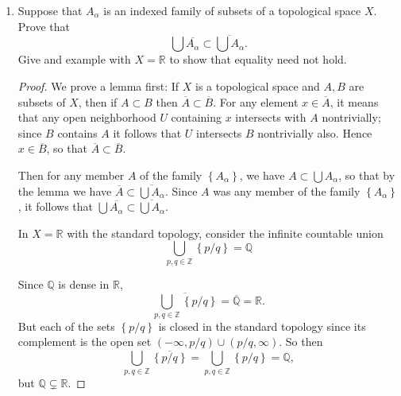 \documentclass[11pt]{article}
\newcommand{\cbr}[1]{\left\{#1\right\}}
\begin{document}
\begin{enumerate}
\begin{proof}
      If there exist $y_1,y_2,x_3\in X$ with $y_1 < x_1 <x_3 < x_2 < y_2$, then we can choose disjoint neighborhoods $(y_1, x_3)$ and $(x_3, y_2)$ containing $x_1$ and $x_2$ respectively. In this case if $x_2$ is maximal in $X$ then take the neighborhood containing $x_2$ to be $(x_3, x_2]$; similarly if $x_1$ is minimal in $X$ then take the neighborhood containing $x_1$ to be $[x_1,x_3)$.
      
      If such an $x_3$ does not exist (that is, $x_1$ immediately precedes $x_2$) then choose the disjoint neighborhoods containing $x_1$ and $x_2$ respectively to be $(y_1, x_2)$ and $(x_1,y_2)$. In this case if $x_2$ is maximal in $X$ then take the neighborhood containing $x_2$ to be $(x_1, x_2]$; similarly if $x_1$ is minimal in $X$ then take the neighborhood containing $x_1$ to be $[x_1,x_2)$.

      Thus we can form disjoint neighborhoods around any $x_1$ and $x_2$ in $X$, so $X$ is Hausdorff.
    \end{proof}
    \item Suppose that $A_\alpha$ is an indexed family of subsets of a topological space $X$. Prove that \[\bigcup \overline{A_\alpha}\subset \overline{\bigcup A_\alpha}.\] Give and example with $X = \mathbb{R}$ to show that equality need not hold.
    \begin{proof}
      We prove a lemma first: If $X$ is a topological space and $A,B$ are subsets of $X$, then if $A\subset B$ then $\overline{A}\subset \overline{B}$. For any element $x\in \overline{A}$, it means that any open neighborhood $U$ containing $x$ intersects with $A$ nontrivially; since $B$ contains $A$ it follows that $U$ intersects $B$ nontrivially also. Hence $x\in\overline{B}$, so that $\overline{A}\subset \overline{B}$.

      Then for any member $A$ of the family $\cbr{A_\alpha}$, we have $A\subset \bigcup A_\alpha$, so that by the lemma we have $\overline{A} \subset \overline{\bigcup A_\alpha}$. Since $A$ was any member of the family $\cbr{A_\alpha}$, it follows that $\bigcup \overline{A_\alpha}\subset \overline{\bigcup A_\alpha}$.

      In $X = \mathbb{R}$ with the standard topology, consider the infinite countable union \[\bigcup_{p,q\in \mathbb{Z}} \cbr{p/q} = \mathbb{Q} \]

      Since $\mathbb{Q}$ is dense in $\mathbb{R}$, \[\overline{\bigcup_{p,q\in \mathbb{Z}} \cbr{p/q}} = \overline{\mathbb{Q}} = \mathbb{R}.\] But each of the sets $\cbr{p/q}$ is closed in the standard topology since its complement is the open set $(-\infty, p/q)\cup (p/q, \infty)$. So then \[\bigcup_{p,q\in \mathbb{Z}} \overline{\cbr{p/q}} = \bigcup_{p,q\in \mathbb{Z}} \cbr{p/q} = \mathbb{Q},\] but $\mathbb{Q} \subsetneq \mathbb{R}$.
    \end{proof}
\end{enumerate}
\end{document}

